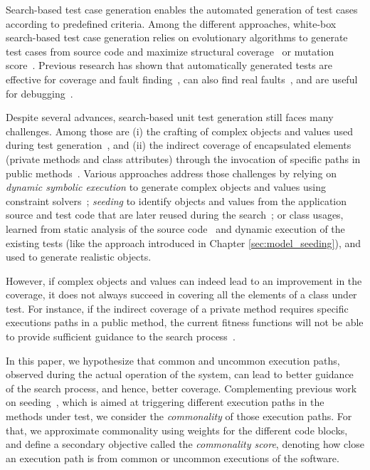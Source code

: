 

Search-based test case generation enables the automated generation of test cases according to predefined criteria. Among the different approaches, white-box search-based test case generation \cite{Fraser2011, Fraser2014b, Panichella2018} relies on evolutionary algorithms to generate test cases from source code and maximize structural coverage~\cite{Fraser2014b, Panichella2018} or mutation score~\cite{Fraser2015a}. 
Previous research has shown that automatically generated tests are effective for coverage and fault finding~\cite{Campos2018, Kracht2014, Panichella2018a}, can also find real faults~\cite{almasi2017industrial}, and are useful for debugging~\cite{Ceccato2015}.

Despite several advances, search-based unit test generation still faces many challenges. Among those are (i) the crafting of complex objects and values used during test generation~\cite{almasi2017industrial}, and 
(ii) the indirect coverage of encapsulated elements (\eg private methods and class attributes) through the invocation of specific paths in public methods~\cite{Salahirad2019}. 
Various approaches address those challenges by relying on \emph{dynamic symbolic execution} to generate complex objects and values using constraint solvers~\cite{Inkumsah2008, Lakhotia2010, Galeotti2013, Gouraud2001}; 
\emph{seeding} to identify objects and values from the application source and test code that are later reused during the search~\cite{Rojas2016}; 
or class usages, learned from static analysis of the source code~\cite{Fraser2011a} and dynamic execution of the existing tests (like the approach introduced in Chapter \ref{sec:model_seeding}), and used to generate realistic objects.

However, if complex objects and values can indeed lead to an improvement in the coverage, it does not always succeed in covering all the elements of a class under test. For instance, if the indirect coverage of a private method requires specific executions paths in a public method, the current fitness functions will not be able to provide sufficient guidance to the search process~\cite{Salahirad2019}. 

In this paper, we hypothesize that common and uncommon execution paths, observed during the actual operation of the system, can lead to better guidance of the search process, and hence, better coverage. Complementing previous work on seeding~\cite{Rojas2016}, which is aimed at triggering different execution paths in the methods under test, we consider the \emph{commonality} of those execution paths. For that, we approximate commonality using weights for the different code blocks, and define a secondary objective called the \emph{commonality score}, denoting how close an execution path is from common or uncommon executions of the software.

